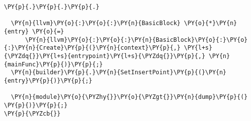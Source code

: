 \begin{Verbatim}[commandchars=\\\{\}]
          \PY{p}{.}\PY{p}{.}\PY{p}{.}

  \PY{n}{llvm}\PY{o}{:}\PY{o}{:}\PY{n}{BasicBlock} \PY{o}{*}\PY{n}{entry} \PY{o}{=}
      \PY{n}{llvm}\PY{o}{:}\PY{o}{:}\PY{n}{BasicBlock}\PY{o}{:}\PY{o}{:}\PY{n}{Create}\PY{p}{(}\PY{n}{context}\PY{p}{,} \PY{l+s}{\PYZdq{}}\PY{l+s}{entrypoint}\PY{l+s}{\PYZdq{}}\PY{p}{,} \PY{n}{mainFunc}\PY{p}{)}\PY{p}{;}
  \PY{n}{builder}\PY{p}{.}\PY{n}{SetInsertPoint}\PY{p}{(}\PY{n}{entry}\PY{p}{)}\PY{p}{;}

  \PY{n}{module}\PY{o}{\PYZhy{}}\PY{o}{\PYZgt{}}\PY{n}{dump}\PY{p}{(} \PY{p}{)}\PY{p}{;}
\PY{p}{\PYZcb{}}
\end{Verbatim}
